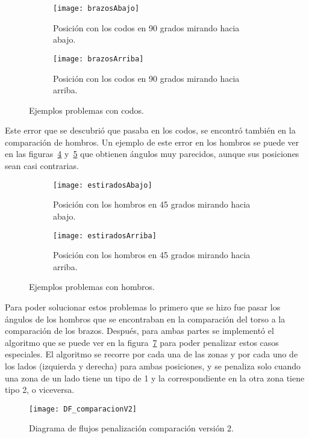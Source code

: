 {\begin{figure}[ht]
	\begin{subfigure}{.48\textwidth}
		\centering
		\texttt{[image: brazosAbajo]}
		\caption{Posición con los codos en 90 grados mirando hacia abajo.}
		\label{fig:brazosAbajo}
	\end{subfigure}
	\begin{subfigure}{.48\textwidth}
		\centering
		\texttt{[image: brazosArriba]}
		\caption{Posición con los codos en 90 grados mirando hacia arriba.}
		\label{fig:brazosArriba}
	\end{subfigure}
	\caption{Ejemplos problemas con codos.}
	\label{fig:codos90}
\end{figure}

Este error que se descubrió que pasaba en los codos, se encontró también en la comparación de hombros. Un ejemplo de este error en los hombros se puede ver en las figuras~\ref{fig:estiradosAbajo} y~\ref{fig:estiradosArriba} que obtienen ángulos muy parecidos, aunque sus posiciones sean casi contrarias.


\begin{figure}[ht]
	\begin{subfigure}{.48\textwidth}
		\centering
		\texttt{[image: estiradosAbajo]}
		\caption{Posición con los hombros en 45 grados mirando hacia abajo.}
		\label{fig:estiradosAbajo}
	\end{subfigure}
	\begin{subfigure}{.48\textwidth}
		\centering
		\texttt{[image: estiradosArriba]}
		\caption{Posición con los hombros en 45 grados mirando hacia arriba.}
		\label{fig:estiradosArriba}
	\end{subfigure}
	\caption{Ejemplos problemas con hombros.}
	\label{fig:hombros90}
\end{figure}

Para poder solucionar estos problemas lo primero que se hizo fue pasar los ángulos de los hombros que se encontraban en la comparación del torso a la comparación de los brazos. Después, para ambas partes se implementó el algoritmo que se puede ver en la figura~\ref{fig:DF_comparacionV2} para poder penalizar estos casos especiales. El algoritmo se recorre por cada una de las zonas y por cada uno de los lados (izquierda y derecha) para ambas posiciones, y se penaliza solo cuando una zona de un lado tiene un tipo de 1 y la correspondiente en la otra zona tiene tipo 2, o viceversa.

\begin{figure}[h]
	\centering
	\texttt{[image: DF\_comparacionV2]}
	\caption{Diagrama de flujos penalización comparación versión 2.}
	\label{fig:DF_comparacionV2}
\end{figure}

}

